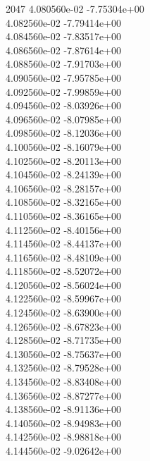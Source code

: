 2047	4.080560e-02	-7.75304e+00	\\ 	4.082560e-02	-7.79414e+00	\\ 	4.084560e-02	-7.83517e+00	\\ 	4.086560e-02	-7.87614e+00	\\ 	4.088560e-02	-7.91703e+00	\\ 	4.090560e-02	-7.95785e+00	\\ 	4.092560e-02	-7.99859e+00	\\ 	4.094560e-02	-8.03926e+00	\\ 	4.096560e-02	-8.07985e+00	\\ 	4.098560e-02	-8.12036e+00	\\ 	4.100560e-02	-8.16079e+00	\\ 	4.102560e-02	-8.20113e+00	\\ 	4.104560e-02	-8.24139e+00	\\ 	4.106560e-02	-8.28157e+00	\\ 	4.108560e-02	-8.32165e+00	\\ 	4.110560e-02	-8.36165e+00	\\ 	4.112560e-02	-8.40156e+00	\\ 	4.114560e-02	-8.44137e+00	\\ 	4.116560e-02	-8.48109e+00	\\ 	4.118560e-02	-8.52072e+00	\\ 	4.120560e-02	-8.56024e+00	\\ 	4.122560e-02	-8.59967e+00	\\ 	4.124560e-02	-8.63900e+00	\\ 	4.126560e-02	-8.67823e+00	\\ 	4.128560e-02	-8.71735e+00	\\ 	4.130560e-02	-8.75637e+00	\\ 	4.132560e-02	-8.79528e+00	\\ 	4.134560e-02	-8.83408e+00	\\ 	4.136560e-02	-8.87277e+00	\\ 	4.138560e-02	-8.91136e+00	\\ 	4.140560e-02	-8.94983e+00	\\ 	4.142560e-02	-8.98818e+00	\\ 	4.144560e-02	-9.02642e+00	\\ \hline
